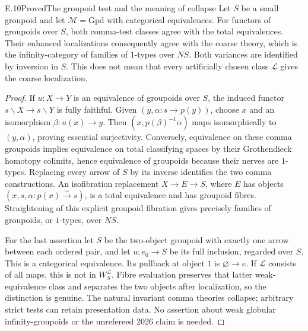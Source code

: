 \begin{claim}{E.10}{Proved}{The groupoid test and the meaning of collapse}
Let $S$ be a small groupoid and let $\mathcal M=\mathrm{Gpd}$ with categorical equivalences. For functors of groupoids over $S$, both comma-test classes agree with the total equivalences. Their enhanced localizations consequently agree with the coarse theory, which is the infinity-category of families of $1$-types over $NS$. Both variances are identified by inversion in $S$. This does not mean that every artificially chosen class $\mathcal L$ gives the coarse localization.
\end{claim}
\begin{proof}
If $u:X\to Y$ is an equivalence of groupoids over $S$, the induced functor $s\backslash X\to s\backslash Y$ is fully faithful. Given $(y,\alpha:s\to p(y))$, choose $x$ and an isomorphism $\beta:u(x)\to y$. Then $(x,p(\beta)^{-1}\alpha)$ maps isomorphically to $(y,\alpha)$, proving essential surjectivity. Conversely, equivalence on these comma groupoids implies equivalence on total classifying spaces by their Grothendieck homotopy colimits, hence equivalence of groupoids because their nerves are $1$-types. Replacing every arrow of $S$ by its inverse identifies the two comma constructions. An isofibration replacement $X\to E\to S$, where $E$ has objects $(x,s,\alpha:p(x)\xrightarrow{\sim}s)$, is a total equivalence and has groupoid fibres. Straightening of this explicit groupoid fibration gives precisely families of groupoids, or $1$-types, over $NS$.

For the last assertion let $S$ be the two-object groupoid with exactly one arrow between each ordered pair, and let $u:e_0\to S$ be its full inclusion, regarded over $S$. This is a categorical equivalence. Its pullback at object $1$ is $\varnothing\to e$. If $\mathcal L$ consists of all maps, this is not in $W_S^{\mathcal L}$. Fibre evaluation preserves that latter weak-equivalence class and separates the two objects after localization, so the distinction is genuine. The natural invariant comma theories collapse; arbitrary strict tests can retain presentation data. No assertion about weak globular infinity-groupoids or the unrefereed 2026 claim is needed.
\end{proof}



